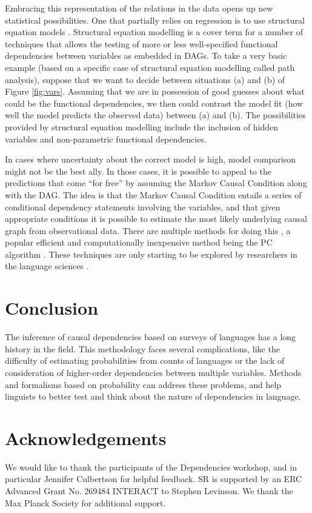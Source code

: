\documentclass[output=paper]{langsci/langscibook}
\begin{document}
 Embracing this representation of the relations in the data opens up new statistical possibilities. One that partially relies on regression is to use structural equation models \citep{duncan2014introduction}. Structural equation modelling is a cover term for a number of techniques that allows the testing of more or less well-specified functional dependencies between variables as embedded in DAGs. To take a very basic example (based on a specific case of structural equation modelling called path analysis), suppose that we want to decide between situations (a) and (b) of Figure \ref{fig:vars}. Assuming that we are in possession of good guesses about what could be the functional dependencies, we then could contrast the model fit (how well the model predicts the observed data) between (a) and (b). The possibilities provided by structural equation modelling include the inclusion of hidden variables and non-parametric functional dependencies.
 
In cases where uncertainty about the correct model is high, model comparison might not be the best ally. In those cases, it is possible to appeal to the predictions that come ``for free'' by assuming the Markov Causal Condition along with the DAG. The idea is that the Markov Causal Condition entails a series of conditional dependency statements involving the variables, and that given appropriate conditions it is possible to estimate the most likely underlying causal graph from observational data.  There are multiple methods for doing this \citep{shalizi2013advanced}, a popular efficient and computationally inexpensive method being the PC algorithm \citep{spirtes2000causation,kalisch2012causal}. These techniques are only starting to be explored by researchers in the language sciences \citep{BlasiRobertsMaathuis, Baayen2016}.
 
\section{Conclusion}
The inference of causal dependencies based on surveys of languages has a long history in the field. This methodology faces several complications, like the difficulty of estimating probabilities from counts of languages or the lack of consideration of higher-order dependencies between multiple variables. Methods and formalisms based on probability can address these problems, and help linguists to better test and think about the nature of dependencies in language.

 
\section*{Acknowledgements}
We would like to thank the participants of the Dependencies workshop, and in particular Jennifer Culbertson for helpful feedback.  SR is supported by an ERC Advanced Grant No. 269484 INTERACT to Stephen Levinson. We thank the Max Planck Society for additional support.



{\sloppy
\printbibliography[heading=subbibliography,notkeyword=this]
}
\end{document}
